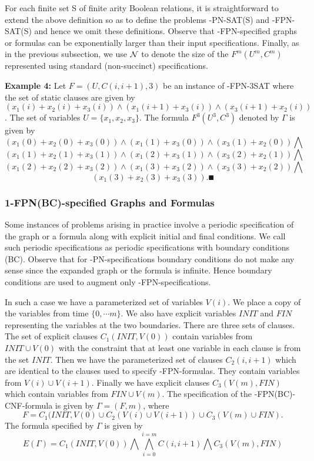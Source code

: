 For each finite set {\sf S} of finite arity Boolean relations, 
it is straightforward to extend the above 
definition so as to define the problems {-PN-SAT(S)}  
and {-FPN-SAT(S)}  and  hence we omit these
definitions.  Observe that 
{-FPN}-specified graphs or formulas can be exponentially larger 
than their input specifications. Finally, as in the previous subsection, 
we use ${\cal N}$ to denote the size of the $F^m(U^m, C^m)$ represented
using standard (non-succinct) specifications.


	 
\noindent
{\bf Example 4:}
Let $F= (U,C(i, i+1),3)$ be an instance of  {-FPN-3SAT} 
where the set of static clauses are given by
$(x_1(i) + x_2(i) + x_3(i) )  \wedge 
(x_1(i+1) + x_3(i)) \wedge (x_3(i+1) + x_2(i))$.
The set of variables $U = \{ x_1, x_2, x_3 \}$.
The formula $F^3(U^3,C^3)$ denoted by $\Gamma$ is given by 
\[(x_1(0) + x_2(0) + x_3(0)) \wedge (x_1(1) + x_3(0)) \wedge (x_3(1) + x_2(0)) 
\bigwedge \]
\[(x_1(1) + x_2(1) + x_3(1)) \wedge (x_1(2) + x_3(1)) \wedge (x_3(2) + x_2(1)) 
\bigwedge \]
\[(x_1(2) + x_2(2) + x_3(2)) \wedge (x_1(3) + x_3(2)) \wedge (x_3(3) + x_2(2)) 
\bigwedge \]
\[(x_1(3) + x_2(3) + x_3(3)). \QED\]



\subsubsection{1-FPN(BC)-specified Graphs and Formulas}
Some instances of problems arising in practice involve a periodic specification
of the graph or a formula along with explicit initial and final conditions.
We call such periodic specifications as periodic specifications with boundary
conditions ({\sf BC}). 
Observe that for {-PN}-specifications boundary conditions
do not make any sense since the expanded graph or the formula is infinite.
Hence boundary conditions are used to augment only {-FPN}-specifications.

In such a case we have a parameterized set of variables $V(i)$.
We place a copy of the variables from time $\{ 0, \cdots m \}$.
We also have explicit variables $INIT$ and $FIN$ 
representing the variables at the
two boundaries. There are three sets of clauses.
The set of explicit clauses $C_1(INIT, V(0))$ contain variables from 
$INIT \cup V(0)$  with the constraint that at least one variable in each clause
is from the set $INIT$. Then we have the parameterized set of clauses
$C_2(i, i+1)$ which are identical to the clauses used to specify 
{-FPN}-formulas. They contain variables from $V(i) \cup V(i+1)$.
Finally we have explicit clauses $C_3(V(m), FIN)$ which contain variables from
$FIN \cup V(m)$. 
The specification of the {-FPN(BC)-CNF}-formula is given by
$\Gamma = ( F, m)$, where 
\[F = C_1(INIT, V(0) \cup C_2(V(i) \cup V(i+1)) \cup C_3(V(m) \cup FIN). \]
The formula specified by $\Gamma$ is given by 
\[E(\Gamma) =  
C_1(INIT, V(0)) \bigwedge \bigwedge_{i = 0}^{ i = m} C(i, i+1) \bigwedge 
C_3(V(m), FIN)   \]
